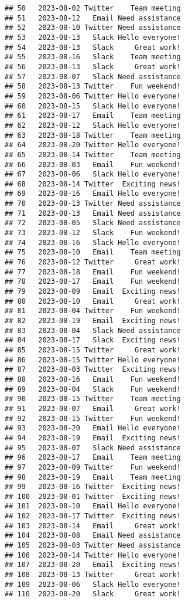 \documentclass[
]{article}
\begin{document}
\begin{verbatim}
## 50   2023-08-02 Twitter    Team meeting
## 51   2023-08-12   Email Need assistance
## 52   2023-08-10 Twitter Need assistance
## 53   2023-08-13   Slack Hello everyone!
## 54   2023-08-13   Slack     Great work!
## 55   2023-08-16   Slack    Team meeting
## 56   2023-08-13   Slack     Great work!
## 57   2023-08-07   Slack Need assistance
## 58   2023-08-13 Twitter    Fun weekend!
## 59   2023-08-06 Twitter Hello everyone!
## 60   2023-08-15   Slack Hello everyone!
## 61   2023-08-17   Email    Team meeting
## 62   2023-08-12   Slack Hello everyone!
## 63   2023-08-18 Twitter    Team meeting
## 64   2023-08-20 Twitter Hello everyone!
## 65   2023-08-14 Twitter    Team meeting
## 66   2023-08-03   Email    Fun weekend!
## 67   2023-08-06   Slack Hello everyone!
## 68   2023-08-14 Twitter  Exciting news!
## 69   2023-08-16   Email Hello everyone!
## 70   2023-08-13 Twitter Need assistance
## 71   2023-08-13   Email Need assistance
## 72   2023-08-05   Slack Need assistance
## 73   2023-08-12   Slack    Fun weekend!
## 74   2023-08-16   Slack Hello everyone!
## 75   2023-08-10   Email    Team meeting
## 76   2023-08-12 Twitter     Great work!
## 77   2023-08-18   Email    Fun weekend!
## 78   2023-08-17   Email    Fun weekend!
## 79   2023-08-09   Email  Exciting news!
## 80   2023-08-10   Email     Great work!
## 81   2023-08-04 Twitter    Fun weekend!
## 82   2023-08-19   Email  Exciting news!
## 83   2023-08-04   Slack Need assistance
## 84   2023-08-17   Slack  Exciting news!
## 85   2023-08-15 Twitter     Great work!
## 86   2023-08-15 Twitter Hello everyone!
## 87   2023-08-03 Twitter  Exciting news!
## 88   2023-08-16   Email    Fun weekend!
## 89   2023-08-04   Slack    Fun weekend!
## 90   2023-08-15 Twitter    Team meeting
## 91   2023-08-07   Email     Great work!
## 92   2023-08-15 Twitter    Fun weekend!
## 93   2023-08-20   Email Hello everyone!
## 94   2023-08-19   Email  Exciting news!
## 95   2023-08-07   Slack Need assistance
## 96   2023-08-17   Email    Team meeting
## 97   2023-08-09 Twitter    Fun weekend!
## 98   2023-08-19   Email    Team meeting
## 99   2023-08-16 Twitter  Exciting news!
## 100  2023-08-01 Twitter  Exciting news!
## 101  2023-08-10   Email Hello everyone!
## 102  2023-08-17 Twitter  Exciting news!
## 103  2023-08-14   Email     Great work!
## 104  2023-08-08   Email Need assistance
## 105  2023-08-03 Twitter Need assistance
## 106  2023-08-14 Twitter Hello everyone!
## 107  2023-08-20   Email  Exciting news!
## 108  2023-08-13 Twitter     Great work!
## 109  2023-08-06   Slack Hello everyone!
## 110  2023-08-20   Slack     Great work!

\end{verbatim}
\end{document}
